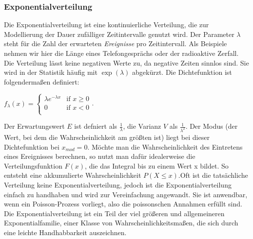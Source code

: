 \documentclass[letterpaper, titlepage]{article}
\begin{document}
\subsubsection{Exponentialverteilung}\label{Exponentialverteilung}
Die Exponentialverteilung ist eine kontinuierliche Verteilung, die zur Modellierung der Dauer zufälliger Zeitintervalle genutzt wird. Der Parameter $\lambda$ steht für die Zahl der erwarteten \textit{Ereignisse} pro Zeitintervall. Als Beispiele nehmen wir hier die Länge eines Telefongesprächs oder der radioaktive Zerfall. Die Verteilung lässt keine negativen Werte zu, da negative Zeiten sinnlos sind. Sie wird in der Statistik häufig mit $\exp(\lambda)$ abgekürzt. Die Dichtefunktion ist folgendermaßen definiert:
\begin{flushleft}
        $f_{\lambda}(x) =
        \begin{cases}
            \lambda e^{-\lambda x} & \text{if } x \geq 0 \\
            0 & \text{if } x < 0 \\
        \end{cases}$.      
\end{flushleft} 
Der Erwartungswert $E$ ist defniert als $\frac{1}{\lambda}$, die Varianz $V$ als $\frac{1}{\lambda^2}$. Der Modus (der Wert, bei dem die Wahrscheinlichkeit am größten ist) liegt bei dieser Dichtefunktion bei $x_{mod}=0$. Möchte man die Wahrscheinlichkeit des Eintretens eines Ereignisses berechnen, so nutzt man dafür idealerweise die Verteilungsfunktion $F(x)$, die das Integral bis zu einem Wert x bildet. So entsteht eine akkumulierte Wahrscheinlichkeit $P(X\leq x)$.Oft ist die tatsächliche Verteilung keine Exponentialverteilung, jedoch ist die Exponentialverteilung einfach zu handhaben und wird zur Vereinfachung angewandt. Sie ist anwendbar, wenn ein Poisson-Prozess vorliegt, also die poissonschen Annahmen erfüllt sind. Die Exponentialverteilung ist ein Teil der viel größeren und allgemeineren Exponentialfamilie, einer Klasse von Wahrscheinlichkeitsmaßen, die sich durch eine leichte Handhabbarkeit auszeichnen.    
\end{document}
